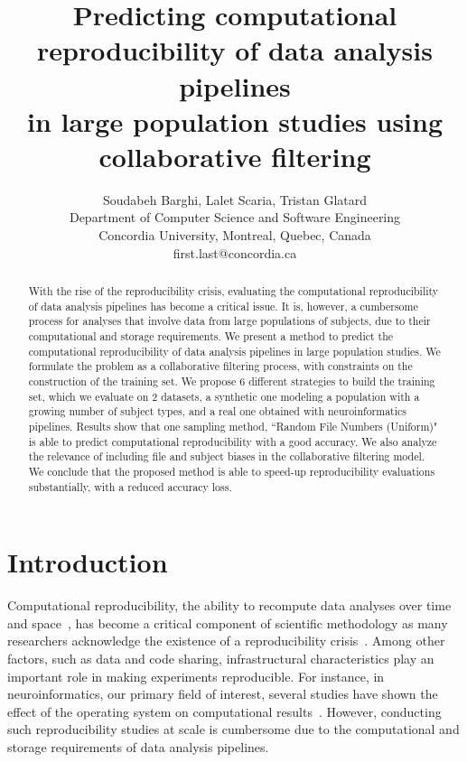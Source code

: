 \documentclass[10pt, conference, compsocconf]{IEEEtran}
\begin{document}
\title{Predicting computational reproducibility of data analysis pipelines \\in large population studies using collaborative filtering}

\author{Soudabeh Barghi, Lalet Scaria, Tristan Glatard\\
  Department of Computer Science and Software Engineering\\ Concordia University, Montreal, Quebec, Canada\\
  {first.last}@concordia.ca \vspace*{-0.5cm}}

\maketitle

\begin{abstract}
With the rise of the reproducibility crisis, evaluating the 
computational reproducibility of data analysis pipelines has become a 
critical issue. It is, however, a cumbersome 
process for analyses that involve data from large populations of 
subjects, due to their computational and storage requirements. 
We present a method to predict the computational 
reproducibility of data analysis pipelines in large population studies. 
We formulate the problem as a collaborative filtering process, with 
constraints on the construction of the training set. We propose 6 
different strategies to build the training set, which we evaluate on 2 
datasets, a synthetic one modeling a population with a growing number 
of subject types, and a real one obtained with neuroinformatics 
pipelines. Results show that one sampling method, ``Random File Numbers 
(Uniform)" is able to predict computational reproducibility with a good 
accuracy. We also analyze the relevance of including file and subject 
biases in the collaborative filtering model. We conclude that the 
proposed method is able to speed-up reproducibility 
evaluations substantially, with a reduced accuracy loss.
\end{abstract}

\section{Introduction}

Computational reproducibility, the ability to recompute data analyses 
over time and 
space~\cite{peng2011reproducible}, has become a critical component of 
scientific methodology as many researchers acknowledge the existence of 
a reproducibility crisis~\cite{baker2016there}. Among other factors, 
such as data and code sharing, infrastructural characteristics 
play an important role in making experiments reproducible. For instance, in 
neuroinformatics, our primary field of interest, several studies have 
shown the effect of the 
operating system on computational 
results~\cite{gronenschild2012effects, glatard2015reproducibility}.
However, conducting such reproducibility studies at scale is cumbersome 
due to the computational and storage requirements of data analysis 
pipelines.
\end{document}
